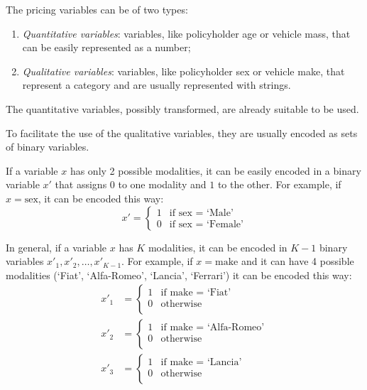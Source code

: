 \documentclass[a4paper, twoside, openright, 12pt]{report}
\providecommand{\tightlist}{%
  \setlength{\itemsep}{0pt}\setlength{\parskip}{0pt}}
\theoremstyle{definition}
\theoremstyle{definition}
\theoremstyle{definition}
\theoremstyle{remark}
\begin{document}
The pricing variables can be of two types:

\begin{enumerate}
\def\labelenumi{\arabic{enumi}.}
\tightlist
\item
  \emph{Quantitative variables}: variables, like policyholder age or vehicle mass, that can be easily represented as a number;
\item
  \emph{Qualitative variables}: variables, like policyholder sex or vehicle make, that represent a category and are usually represented with strings.
\end{enumerate}

The quantitative variables, possibly transformed, are already suitable to be used.

To facilitate the use of the qualitative variables, they are usually encoded as sets of binary variables.

If a variable \(x\) has only 2 possible modalities, it can be easily encoded in a binary variable \(x'\) that assigns \(0\) to one modality and \(1\) to the other. For example, if \(x = \text{sex}\), it can be encoded this way:
\[
x' = \begin{cases}
1 & \text{if } \text{sex } = \text{ `Male'} \\
0 & \text{if } \text{sex } = \text{ `Female'}
\end{cases}
\]

In general, if a variable \(x\) has \(K\) modalities, it can be encoded in \(K-1\) binary variables \(x'_1, x'_2, \dots, x'_{K-1}\). For example, if \(x = \text{make}\) and it can have 4 possible modalities (`Fiat', `Alfa-Romeo', `Lancia', `Ferrari') it can be encoded this way:
\begin{align*}
x'_1 & = \begin{cases}
1 & \text{if } \text{make } = \text{ `Fiat'} \\
0 & \text{otherwise} \\
\end{cases}
\\
x'_2 & = \begin{cases}
1 & \text{if } \text{make } = \text{ `Alfa-Romeo'} \\
0 & \text{otherwise} \\
\end{cases}
\\
x'_3 & = \begin{cases}
1 & \text{if } \text{make } = \text{ `Lancia'} \\
0 & \text{otherwise} \\
\end{cases}
\\
\end{align*}
\end{document}
